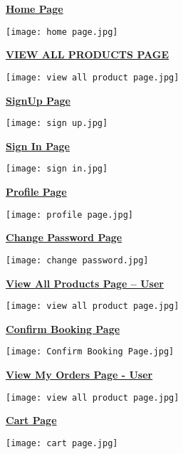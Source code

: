 \documentclass[12pt]{report}
\begin{document}
    \large \textbf{\underline{Home Page}}
    \begin{center}
        \texttt{[image: home page.jpg]}
    \end{center}
    
    \pagebreak
    \large \textbf{\underline{VIEW ALL PRODUCTS PAGE}}
    \begin{center}
        \texttt{[image: view all product page.jpg]}
    \end{center}
    
    \pagebreak
    \large \textbf{\underline{SignUp Page}}
    \begin{center}
        \texttt{[image: sign up.jpg]}
    \end{center}
    
    \pagebreak
    \large \textbf{\underline{Sign In Page}}
    \begin{center}
        \texttt{[image: sign in.jpg]}
    \end{center}
    
    \pagebreak
    \large \textbf{\underline{Profile Page}}
    \begin{center}
        \texttt{[image: profile page.jpg]}
    \end{center}
    
    \pagebreak
    \large \textbf{\underline{Change Password Page}}
    \begin{center}
        \texttt{[image: change password.jpg]}
    \end{center}
    
    \pagebreak
    \large \textbf{\underline{View All Products Page – User}}
    \begin{center}
        \texttt{[image: view all product page.jpg]}
    \end{center}
    
    \pagebreak
    \large \textbf{\underline{Confirm Booking Page}}
    \begin{center}
        \texttt{[image: Confirm Booking Page.jpg]}
    \end{center}
    
    \pagebreak
    \large \textbf{\underline{View My Orders Page - User}}
    \begin{center}
        \texttt{[image: view all product page.jpg]}
    \end{center}
    
    \pagebreak
    \large \textbf{\underline{Cart Page}}
    \begin{center}
        \texttt{[image: cart page.jpg]}
    \end{center}
    
\end{document}
